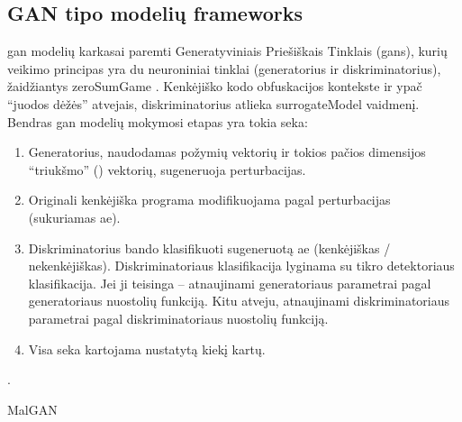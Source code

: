 \subsection{GAN tipo modelių \glspl{framework}}\label{sec:literature:gan}

\acs{gan} modelių karkasai paremti Generatyviniais Priešiškais Tinklais (\aclp{gan}), kurių veikimo principas yra du neuroniniai tinklai (generatorius ir diskriminatorius), žaidžiantys \gls{zeroSumGame} \citeplace. Kenkėjiško kodo obfuskacijos kontekste ir ypač \enquote{juodos dėžės} atvejais, diskriminatorius atlieka \gls{surrogateModel} vaidmenį. Bendras \ac{gan} modelių mokymosi etapas yra tokia seka:
\begin{enumerate}
    \item Generatorius, naudodamas požymių vektorių ir tokios pačios dimensijos
          \enquote{triukšmo} () vektorių, sugeneruoja perturbacijas.
    \item Originali kenkėjiška programa modifikuojama pagal perturbacijas (sukuriamas
          \ac{ae}).
    \item Diskriminatorius bando klasifikuoti sugeneruotą \ac{ae} (kenkėjiškas /
          nekenkėjiškas). Diskriminatoriaus klasifikacija lyginama su tikro detektoriaus
          klasifikacija. Jei ji teisinga -- atnaujinami generatoriaus parametrai pagal
          generatoriaus nuostolių funkciją. Kitu atveju, atnaujinami diskriminatoriaus
          parametrai pagal diskriminatoriaus nuostolių funkciją.
    \item Visa seka kartojama nustatytą kiekį kartų.
\end{enumerate} \citeplace.

\begin{describeFramework}{MalGAN}{\cite{huGeneratingAdversarialMalware2017}}
\end{describeFramework}

